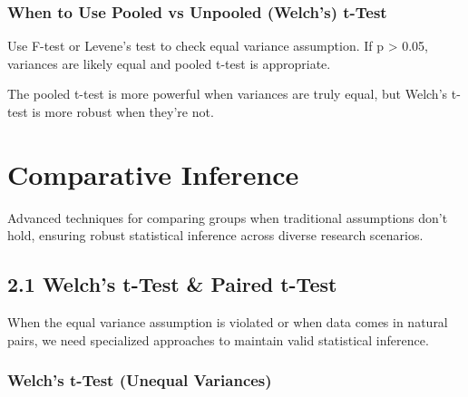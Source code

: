 \documentclass[
  11pt,
  letterpaper,
  oneside]{book}
\begin{document}
\subsection{When to Use Pooled vs Unpooled (Welch's)
t-Test}\label{when-to-use-pooled-vs-unpooled-welchs-t-test}

\begin{tcolorbox}[enhanced jigsaw, coltitle=black, left=2mm, colback=white, title=\textcolor{quarto-callout-warning-color}{\faExclamationTriangle}\hspace{0.5em}{Testing Equal Variances}, opacitybacktitle=0.6, titlerule=0mm, bottomtitle=1mm, colbacktitle=quarto-callout-warning-color!10!white, colframe=quarto-callout-warning-color-frame, breakable, bottomrule=.15mm, opacityback=0, toptitle=1mm, rightrule=.15mm, leftrule=.75mm, arc=.35mm, toprule=.15mm]

Use F-test or Levene's test to check equal variance assumption. If p
\textgreater{} 0.05, variances are likely equal and pooled t-test is
appropriate.

\end{tcolorbox}

The pooled t-test is more powerful when variances are truly equal, but
Welch's t-test is more robust when they're not.


\chapter{Comparative Inference}\label{comparative-inference}

Advanced techniques for comparing groups when traditional assumptions
don't hold, ensuring robust statistical inference across diverse
research scenarios.

\section{2.1 Welch's t-Test \& Paired
t-Test}\label{welchs-t-test-paired-t-test}

When the equal variance assumption is violated or when data comes in
natural pairs, we need specialized approaches to maintain valid
statistical inference.

\subsection{Welch's t-Test (Unequal
Variances)}\label{welchs-t-test-unequal-variances}
\end{document}

